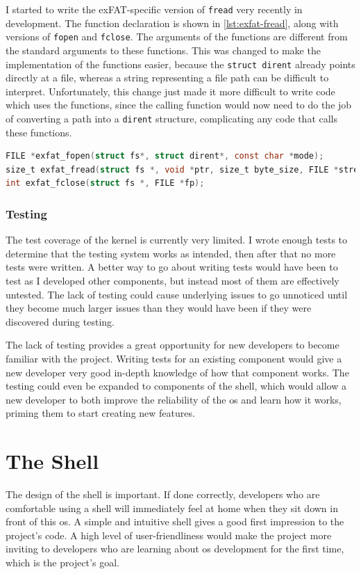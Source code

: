 \documentclass{article}
\begin{document}
I started to write the exFAT-specific version of \texttt{fread} very recently
in development. The function declaration is shown in \autoref{lst:exfat-fread},
along with versions of \texttt{fopen} and \texttt{fclose}. The arguments of the
functions are different from the standard arguments to these functions. This
was changed to make the implementation of the functions easier, because the
\verb!struct dirent! already points directly at a file, whereas a string
representing a file path can be difficult to interpret. Unfortunately, this
change just made it more difficult to write code which uses the functions,
since the calling function would now need to do the job of converting a path
into a \verb!dirent! structure, complicating any code that calls these
functions.

\begin{lstlisting}[language=C, caption={Function declarations of the exFAT
                   versions of \texttt{fopen}, \texttt{fread}, and
                   \texttt{fclose}.}, float, label={lst:exfat-fread}]
FILE *exfat_fopen(struct fs*, struct dirent*, const char *mode);
size_t exfat_fread(struct fs *, void *ptr, size_t byte_size, FILE *stream);
int exfat_fclose(struct fs *, FILE *fp);
\end{lstlisting}

\subsubsection{Testing}
The test coverage of the kernel is currently very limited. I wrote enough tests
to determine that the testing system works as intended, then after that no
more tests were written. A better way to go about writing tests would have been
to test as I developed other components, but instead most of them are
effectively untested. The lack of testing could cause underlying issues to go
unnoticed until they become much larger issues than they would have been if
they were discovered during testing.

The lack of testing provides a great opportunity for new developers to become
familiar with the project. Writing tests for an existing component would give a
new developer very good in-depth knowledge of how that component works. The
testing could even be expanded to components of the shell, which would allow a
new developer to both improve the reliability of the \gls{os} and learn how it
works, priming them to start creating new features.

\section{The Shell}
The design of the shell is important. If done correctly, developers who are
comfortable using a shell will immediately feel at home when they sit down in
front of this \gls{os}. A simple and intuitive shell gives a good first
impression to the project's code. A high level of user-friendliness would make
the project more inviting to developers who are learning about \gls{os}
development for the first time, which is the project's goal.
\end{document}
